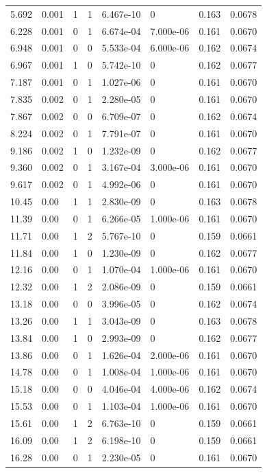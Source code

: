 \documentclass[preview]{standalone}
\begin{document}
{{\begin{tabular}{L{1.2cm}C{1.2cm} C{0.3cm}C{0.5cm} C{1.4cm}C{1.4cm} C{1.4cm}C{1.4cm}}
  5.692  &  0.001  & 1     &  1 &  6.467e-10  & 0  & 0.163 &  0.0678   \\ 
  6.228  &  0.001  & 0     &  1 &  6.674e-04  & 7.000e-06  & 0.161 &  0.0670   \\ 
  6.948  &  0.001  & 0     &  0 &  5.533e-04  & 6.000e-06  & 0.162 &  0.0674   \\ 
  6.967  &  0.001  & 1     &  0 &  5.742e-10  & 0  & 0.162 &  0.0677   \\ 
  7.187  &  0.001  & 0     &  1 &  1.027e-06  & 0  & 0.161 &  0.0670   \\ 
  7.835  &  0.002  & 0     &  1 &  2.280e-05  & 0  & 0.161 &  0.0670   \\ 
  7.867  &  0.002  & 0     &  0 &  6.709e-07  & 0  & 0.162 &  0.0674   \\ 
  8.224  &  0.002  & 0     &  1 &  7.791e-07  & 0  & 0.161 &  0.0670   \\ 
  9.186  &  0.002  & 1     &  0 &  1.232e-09  & 0  & 0.162 &  0.0677   \\ 
  9.360  &  0.002  & 0     &  1 &  3.167e-04  & 3.000e-06  & 0.161 &  0.0670   \\ 
  9.617  &  0.002  & 0     &  1 &  4.992e-06  & 0  & 0.161 &  0.0670   \\ 
  10.45  &  0.00  & 1     &  1 &  2.830e-09  & 0  & 0.163 &  0.0678   \\ 
  11.39  &  0.00  & 0     &  1 &  6.266e-05  & 1.000e-06  & 0.161 &  0.0670   \\ 
  11.71  &  0.00  & 1     &  2 &  5.767e-10  & 0  & 0.159 &  0.0661   \\ 
  11.84  &  0.00  & 1     &  0 &  1.230e-09  & 0  & 0.162 &  0.0677   \\ 
  12.16  &  0.00  & 0     &  1 &  1.070e-04  & 1.000e-06  & 0.161 &  0.0670   \\ 
  12.32  &  0.00  & 1     &  2 &  2.086e-09  & 0  & 0.159 &  0.0661   \\ 
  13.18  &  0.00  & 0     &  0 &  3.996e-05  & 0  & 0.162 &  0.0674   \\ 
  13.26  &  0.00  & 1     &  1 &  3.043e-09  & 0  & 0.163 &  0.0678   \\ 
  13.84  &  0.00  & 1     &  0 &  2.993e-09  & 0  & 0.162 &  0.0677   \\ 
  13.86  &  0.00  & 0     &  1 &  1.626e-04  & 2.000e-06  & 0.161 &  0.0670   \\ 
  14.78  &  0.00  & 0     &  1 &  1.008e-04  & 1.000e-06  & 0.161 &  0.0670   \\ 
  15.18  &  0.00  & 0     &  0 &  4.046e-04  & 4.000e-06  & 0.162 &  0.0674   \\ 
  15.53  &  0.00  & 0     &  1 &  1.103e-04  & 1.000e-06  & 0.161 &  0.0670   \\ 
  15.61  &  0.00  & 1     &  2 &  6.763e-10  & 0  & 0.159 &  0.0661   \\ 
  16.09  &  0.00  & 1     &  2 &  6.198e-10  & 0  & 0.159 &  0.0661   \\ 
  16.28  &  0.00  & 0     &  1 &  2.230e-05  & 0  & 0.161 &  0.0670   \\ 
\hline 
\end{tabular} 

}}
\end{document}
